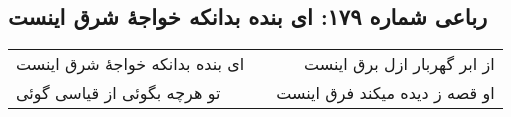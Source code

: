 \begin{center}
\section*{رباعی شماره ۱۷۹: ای بنده بدانکه خواجهٔ شرق اینست}
\label{sec:0179}
\begin{longtable}{l p{0.5cm} r}
ای بنده بدانکه خواجهٔ شرق اینست
&&
از ابر گهربار ازل برق اینست
\\
تو هرچه بگوئی از قیاسی گوئی
&&
او قصه ز دیده میکند فرق اینست
\\
\end{longtable}
\end{center}

